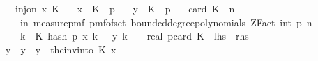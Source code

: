 \begin{isabellebody}
\ \ \ {\isachardoublequoteopen}inj{\isacharunderscore}{\kern0pt}on\ x\ K{\isachardoublequoteclose}\isanewline
\ \ \ {\isachardoublequoteopen}x\ {\isacharbackquote}{\kern0pt}\ K\ {\isasymsubseteq}\ {\isacharbraceleft}{\kern0pt}{}{\isachardot}{\kern0pt}{\isachardot}{\kern0pt}{\isacharless}{\kern0pt}p{\isacharbraceright}{\kern0pt}{\isachardoublequoteclose}\isanewline
\ \ \ {\isachardoublequoteopen}y\ {\isacharbackquote}{\kern0pt}\ K\ {\isasymsubseteq}\ {\isacharbraceleft}{\kern0pt}{}{\isachardot}{\kern0pt}{\isachardot}{\kern0pt}{\isacharless}{\kern0pt}p{\isacharbraceright}{\kern0pt}{\isachardoublequoteclose}\isanewline
\ \ \ {\isachardoublequoteopen}card\ K\ {\isasymle}\ n{\isachardoublequoteclose}\isanewline
\ \ \ {\isachardoublequoteopen}{\isasymP}{\isacharparenleft}{\kern0pt}{\isasymomega}\ in\ measure{\isacharunderscore}{\kern0pt}pmf\ {\isacharparenleft}{\kern0pt}pmf{\isacharunderscore}{\kern0pt}of{\isacharunderscore}{\kern0pt}set\ {\isacharparenleft}{\kern0pt}bounded{\isacharunderscore}{\kern0pt}degree{\isacharunderscore}{\kern0pt}polynomials\ {\isacharparenleft}{\kern0pt}ZFact\ {\isacharparenleft}{\kern0pt}int\ p{\isacharparenright}{\kern0pt}{\isacharparenright}{\kern0pt}\ n{\isacharparenright}{\kern0pt}{\isacharparenright}{\kern0pt}{\isachardot}{\kern0pt}\isanewline
\ \ \ \ {\isacharparenleft}{\kern0pt}{\isasymforall}k\ {\isasymin}\ K{\isachardot}{\kern0pt}\ hash\ p\ {\isacharparenleft}{\kern0pt}x\ k{\isacharparenright}{\kern0pt}\ {\isasymomega}\ {\isacharequal}{\kern0pt}\ {\isacharparenleft}{\kern0pt}y\ k{\isacharparenright}{\kern0pt}{\isacharparenright}{\kern0pt}{\isacharparenright}{\kern0pt}\ {\isacharequal}{\kern0pt}\ {}\ {\isacharslash}{\kern0pt}\ real\ p{\isacharcircum}{\kern0pt}card\ K{\isachardoublequoteclose}\ {\isacharparenleft}{\kern0pt}\ {\isachardoublequoteopen}{\isacharquery}{\kern0pt}lhs\ {\isacharequal}{\kern0pt}\ {\isacharquery}{\kern0pt}rhs{\isachardoublequoteclose}{\isacharparenright}{\kern0pt}\isanewline
%
\isadelimproof
%
\endisadelimproof
%
\isatagproof
{}\isamarkupfalse%
\ {\isacharminus}{\kern0pt}\isanewline
\ \ \isamarkupfalse%
\ y{\isacharprime}{\kern0pt}\ \ {\isachardoublequoteopen}y{\isacharprime}{\kern0pt}\ {\isacharequal}{\kern0pt}\ y\ {\isasymcirc}\ {\isacharparenleft}{\kern0pt}the{\isacharunderscore}{\kern0pt}inv{\isacharunderscore}{\kern0pt}into\ K\ x{\isacharparenright}{\kern0pt}{\isachardoublequoteclose}\isanewline
\ \ \isamarkupfalse%

\end{isabellebody}
